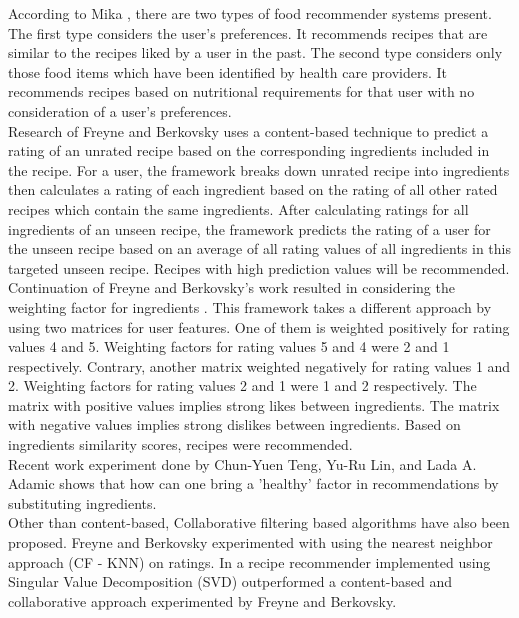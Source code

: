 \noindent According to Mika \cite{44}, there are two types of food recommender systems present. The first type considers the user's preferences. It recommends recipes that are similar to the recipes liked by a user in the past. The second type considers only those food items which have been identified by health care providers. It recommends recipes based on nutritional requirements for that user with no consideration of a user's preferences.
\\
\noindent Research of Freyne and Berkovsky \cite{13} uses a content-based technique to predict a rating of an unrated recipe based on the corresponding ingredients included in the recipe. For a user, the framework breaks down unrated recipe into ingredients then calculates a rating of each ingredient based on the rating of all other rated recipes which contain the same ingredients. After calculating ratings for all ingredients of an unseen recipe, the framework predicts the rating of a user for the unseen recipe based on an average of all rating values of all ingredients in this targeted unseen recipe. Recipes with high prediction values will be recommended.
\\
\noindent Continuation of Freyne and Berkovsky's \cite{13} work resulted in considering the weighting factor for ingredients \cite{15}. This framework takes a different approach by using two matrices for user features. One of them is weighted positively for rating values 4 and 5. Weighting factors for rating values 5 and 4 were 2 and 1 respectively. Contrary, another matrix weighted negatively for rating values 1 and 2. Weighting factors for rating values 2 and 1 were 1 and 2 respectively. The matrix with positive values implies strong likes between ingredients. The matrix with negative values implies strong dislikes between ingredients. Based on ingredients similarity scores, recipes were recommended.
\\
\noindent Recent work experiment done by Chun-Yuen Teng, Yu-Ru Lin, and Lada A. Adamic \cite{17} shows that how can one bring a 'healthy' factor in recommendations by substituting ingredients.
\\
\noindent Other than content-based, Collaborative filtering based algorithms have also been proposed. Freyne and Berkovsky experimented with using the nearest neighbor approach (CF - KNN) on ratings. In \cite{15} a recipe recommender implemented using Singular Value Decomposition (SVD) outperformed a content-based and collaborative approach experimented by Freyne and Berkovsky.
\\
